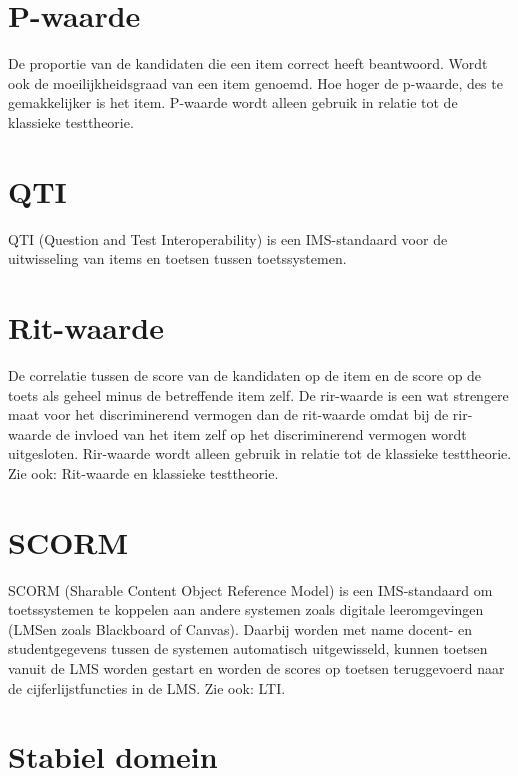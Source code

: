 \documentclass[
  letterpaper,
  DIV=11,
  numbers=noendperiod]{scrreprt}
\begin{document}
\hypertarget{p-waarde}{%
\section{P-waarde}\label{p-waarde}}

De proportie van de kandidaten die een item correct heeft beantwoord.
Wordt ook de moeilijkheidsgraad van een item genoemd. Hoe hoger de
p-waarde, des te gemakkelijker is het item. P-waarde wordt alleen
gebruik in relatie tot de klassieke testtheorie.

\hypertarget{qti}{%
\section{QTI}\label{qti}}

QTI (Question and Test Interoperability) is een IMS-standaard voor de
uitwisseling van items en toetsen tussen toetssystemen.

\hypertarget{rit-waarde}{%
\section{Rit-waarde}\label{rit-waarde}}

De correlatie tussen de score van de kandidaten op de item en de score
op de toets als geheel minus de betreffende item zelf. De rir-waarde is
een wat strengere maat voor het discriminerend vermogen dan de
rit-waarde omdat bij de rir-waarde de invloed van het item zelf op het
discriminerend vermogen wordt uitgesloten. Rir-waarde wordt alleen
gebruik in relatie tot de klassieke testtheorie. Zie ook: Rit-waarde en
klassieke testtheorie.

\hypertarget{scorm}{%
\section{SCORM}\label{scorm}}

SCORM (Sharable Content Object Reference Model) is een IMS-standaard om
toetssystemen te koppelen aan andere systemen zoals digitale
leeromgevingen (LMSen zoals Blackboard of Canvas). Daarbij worden met
name docent- en studentgegevens tussen de systemen automatisch
uitgewisseld, kunnen toetsen vanuit de LMS worden gestart en worden de
scores op toetsen teruggevoerd naar de cijferlijstfuncties in de LMS.
Zie ook: LTI.

\hypertarget{stabiel-domein}{%
\section{Stabiel domein}\label{stabiel-domein}}
\end{document}
